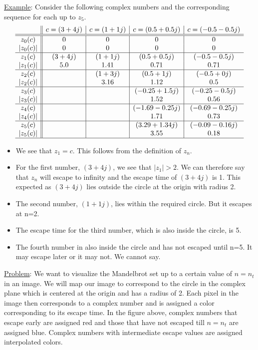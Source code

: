 \documentclass[addpoints]{exam}
\begin{document}
\begin{questions}
\underline{Example}: Consider the following complex numbers and the corresponding sequence for each up to $z_5$.
\[
  \begin{array}{c|*{4}{|c}}
 & c=(3+4j) & c=(1+1j) & c=(0.5+0.5j) & c=(-0.5-0.5j)\\\hline\hline
z_0(c) & 0 & 0 & 0 & 0\\
|z_0(c)| & 0 & 0 & 0 & 0\\\hline
z_1(c) & (3+4j) & (1+1j) & (0.5+0.5j) & (-0.5-0.5j)\\
|z_1(c)| & 5.0 & 1.41 & 0.71 & 0.71\\\hline
z_2(c) &  & (1+3j) & (0.5+1j) & (-0.5+0j)\\
|z_2(c)| &  & 3.16 & 1.12 & 0.5\\\hline
z_3(c) &  &  & (-0.25+1.5j) & (-0.25-0.5j)\\
|z_3(c)| &  &  & 1.52 & 0.56\\\hline
z_4(c) &  &  & (-1.69-0.25j) & (-0.69-0.25j)\\
|z_4(c)| &  &  & 1.71 & 0.73\\\hline
z_5(c) &  &  & (3.29+1.34j) & (-0.09-0.16j)\\
|z_5(c)| &  &  & 3.55 & 0.18\\\hline
  \end{array}
  \]

  \begin{itemize}
  \item We see that $z_1=c$. This follows from the definition of $z_n$.
  \item For the first number, $(3+4j)$, we see that $|z_1|>2$. We can therefore say that $z_n$ will escape to infinity and the escape time of $(3+4j)$ is 1. This expected as $(3+4j)$ lies outside the circle at the origin with radius 2.
  \item The second number, $(1+1j)$, lies within the required circle. But it escapes at n=2.
  \item The escape time for the third number, which is also inside the circle, is 5.
  \item The fourth number in also inside the circle and has not escaped until n=5. It may escape later or it may not. We cannot say.
  \end{itemize}
  
  \underline{Problem}: We want to visualize the Mandelbrot set up to a certain value of $n=n_t$ in an image. We will map our image to correspond to the circle in the complex plane which is centered at the origin and has a radius of 2. Each pixel in the image then corresponds to a complex number and is assigned a color corresponding to its escape time. In the figure above, complex numbers that escape early are assigned red and those that have not escaped till $n=n_t$ are assigned blue. Complex numbers with intermediate escape values are assigned interpolated colors. 


\end{questions}
\end{document}
